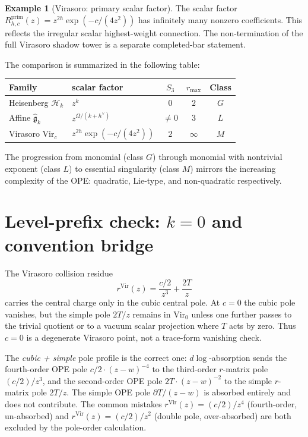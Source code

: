 \documentclass[11pt]{article}
\theoremstyle{definition}
\newtheorem{example}[theorem]{Example}
\theoremstyle{remark}
\newcommand{\cH}{\mathcal{H}}
\newcommand{\fg}{\mathfrak{g}}
\newcommand{\Vir}{\mathrm{Vir}}
\numberwithin{equation}{section}
\begin{document}
\begin{example}[Virasoro: primary scalar factor]\label{ex:virasoro}
The scalar factor
$R^{\mathrm{prim}}_{h,c}(z)=z^{2h}\exp(-c/(4z^2))$ has infinitely
many nonzero coefficients. This reflects the irregular scalar
highest-weight connection. The non-termination of the full Virasoro
shadow tower is a separate completed-bar statement.
\end{example}

The comparison is summarized in the following table:
\begin{center}
\renewcommand{\arraystretch}{1.2}
\begin{tabular}{@{}llccc@{}}
\toprule
\textbf{Family} & scalar factor & $S_3$ & $r_{\max}$ & \textbf{Class}\\
\midrule
Heisenberg $\cH_k$ & $z^k$ & $0$ & $2$ & $G$\\
Affine $\widehat{\fg}_k$ &
 $z^{\Omega/(k+h^\vee)}$ & $\neq 0$ & $3$ & $L$\\
Virasoro $\Vir_c$ &
 $z^{2h}\exp(-c/(4z^2))$ & $2$ & $\infty$ & $M$\\
\bottomrule
\end{tabular}
\end{center}

\noindent
The progression from monomial (class $G$) through monomial with
nontrivial exponent (class $L$) to essential singularity (class $M$)
mirrors the increasing complexity of the OPE: quadratic, Lie-type,
and non-quadratic respectively.

\section{Level-prefix check: $k=0$ and convention bridge}
\label{sec:level-prefix-check-virr}

The Virasoro collision residue
\[
 r^{\Vir}(z)=\frac{c/2}{z^3}+\frac{2T}{z}
\]
carries the central charge only in the cubic central pole. At $c=0$
the cubic pole vanishes, but the simple pole $2T/z$ remains in
$\Vir_0$ unless one further passes to the trivial quotient or to a
vacuum scalar projection where $T$ acts by zero. Thus $c=0$ is a
degenerate Virasoro point, not a trace-form vanishing check.

The \emph{cubic + simple} pole profile is the correct one:
$d\log$-absorption sends the fourth-order OPE pole $c/2
\cdot (z-w)^{-4}$ to the third-order $r$-matrix pole
$(c/2)/z^3$, and the second-order OPE pole $2T \cdot (z-w)^{-2}$ to
the simple $r$-matrix pole $2T/z$. The simple OPE pole
$\partial T/(z-w)$ is absorbed entirely and does not contribute.
The common mistakes $r^{\Vir}(z) = (c/2)/z^4$ (fourth-order,
un-absorbed) and $r^{\Vir}(z) = (c/2)/z^2$ (double pole,
over-absorbed) are both excluded by the pole-order calculation.
\end{document}
